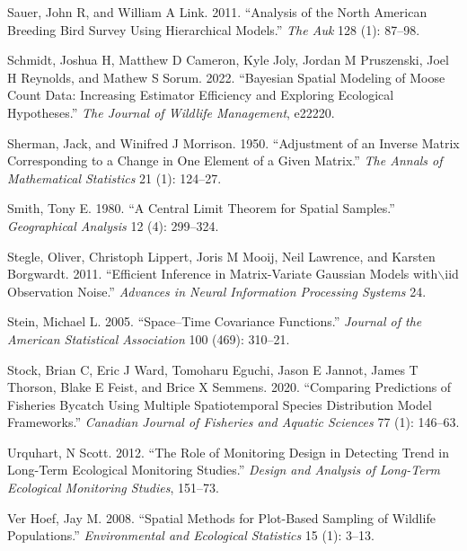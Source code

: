 \documentclass[smallextended]{svjour3}       %
\newlength{\cslhangindent}
\newlength{\cslentryspacingunit} %
\newenvironment{CSLReferences}[2] %
 {%
  \setlength{\parindent}{0pt}
  \ifodd #1
  \let\oldpar\par
  \def\par{\hangindent=\cslhangindent\oldpar}
  \fi
  \setlength{\parskip}{#2\cslentryspacingunit}
 }%
 {}
\begin{document}
\begin{CSLReferences}{1}{0}
\leavevmode{}%
Sauer, John R, and William A Link. 2011. {``Analysis of the North
American Breeding Bird Survey Using Hierarchical Models.''} \emph{The
Auk} 128 (1): 87--98.

\leavevmode{}%
Schmidt, Joshua H, Matthew D Cameron, Kyle Joly, Jordan M Pruszenski,
Joel H Reynolds, and Mathew S Sorum. 2022. {``Bayesian Spatial Modeling
of Moose Count Data: Increasing Estimator Efficiency and Exploring
Ecological Hypotheses.''} \emph{The Journal of Wildlife Management},
e22220.

\leavevmode{}%
Sherman, Jack, and Winifred J Morrison. 1950. {``Adjustment of an
Inverse Matrix Corresponding to a Change in One Element of a Given
Matrix.''} \emph{The Annals of Mathematical Statistics} 21 (1): 124--27.

\leavevmode{}%
Smith, Tony E. 1980. {``A Central Limit Theorem for Spatial Samples.''}
\emph{Geographical Analysis} 12 (4): 299--324.

\leavevmode{}%
Stegle, Oliver, Christoph Lippert, Joris M Mooij, Neil Lawrence, and
Karsten Borgwardt. 2011. {``Efficient Inference in Matrix-Variate
Gaussian Models with\(\backslash\)iid Observation Noise.''}
\emph{Advances in Neural Information Processing Systems} 24.

\leavevmode{}%
Stein, Michael L. 2005. {``Space--Time Covariance Functions.''}
\emph{Journal of the American Statistical Association} 100 (469):
310--21.

\leavevmode{}%
Stock, Brian C, Eric J Ward, Tomoharu Eguchi, Jason E Jannot, James T
Thorson, Blake E Feist, and Brice X Semmens. 2020. {``Comparing
Predictions of Fisheries Bycatch Using Multiple Spatiotemporal Species
Distribution Model Frameworks.''} \emph{Canadian Journal of Fisheries
and Aquatic Sciences} 77 (1): 146--63.

\leavevmode{}%
Urquhart, N Scott. 2012. {``The Role of Monitoring Design in Detecting
Trend in Long-Term Ecological Monitoring Studies.''} \emph{Design and
Analysis of Long-Term Ecological Monitoring Studies}, 151--73.

\leavevmode{}%
Ver Hoef, Jay M. 2008. {``Spatial Methods for Plot-Based Sampling of
Wildlife Populations.''} \emph{Environmental and Ecological Statistics}
15 (1): 3--13.


\end{CSLReferences}
\end{document}
